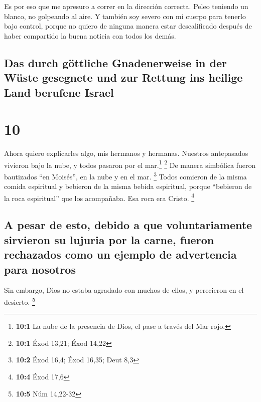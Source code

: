  Es por eso que me apresuro a correr en la dirección
correcta. Peleo teniendo un blanco, no golpeando al aire.
 Y también soy severo con mi cuerpo para tenerlo bajo
control, porque no quiero de ninguna manera estar descalificado después
de haber compartido la buena noticia con todos los demás.

\hypertarget{das-durch-guxf6ttliche-gnadenerweise-in-der-wuxfcste-gesegnete-und-zur-rettung-ins-heilige-land-berufene-israel}{%
\subsection{Das durch göttliche Gnadenerweise in der Wüste gesegnete und
zur Rettung ins heilige Land berufene
Israel}\label{das-durch-guxf6ttliche-gnadenerweise-in-der-wuxfcste-gesegnete-und-zur-rettung-ins-heilige-land-berufene-israel}}

\hypertarget{section-9}{%
\section{10}\label{section-9}}

 Ahora quiero explicarles algo, mis hermanos y hermanas.
Nuestros antepasados vivieron bajo la nube, y todos pasaron por el
mar.\footnote{\textbf{10:1} La nube de la presencia de Dios, el pase a
  través del Mar rojo.} \footnote{\textbf{10:1} Éxod 13,21; Éxod 14,22}
 De manera simbólica fueron bautizados ``en Moisés'', en
la nube y en el mar. \footnote{\textbf{10:2} Éxod 16,4; Éxod 16,35; Deut
  8,3}  Todos comieron de la misma comida espiritual
 y bebieron de la misma bebida espiritual, porque
``bebieron de la roca espiritual'' que los acompañaba. Esa roca era
Cristo. \footnote{\textbf{10:4} Éxod 17,6}

\hypertarget{a-pesar-de-esto-debido-a-que-voluntariamente-sirvieron-su-lujuria-por-la-carne-fueron-rechazados-como-un-ejemplo-de-advertencia-para-nosotros}{%
\subsection{A pesar de esto, debido a que voluntariamente sirvieron su
lujuria por la carne, fueron rechazados como un ejemplo de advertencia
para
nosotros}\label{a-pesar-de-esto-debido-a-que-voluntariamente-sirvieron-su-lujuria-por-la-carne-fueron-rechazados-como-un-ejemplo-de-advertencia-para-nosotros}}

 Sin embargo, Dios no estaba agradado con muchos de ellos,
y perecieron en el desierto. \footnote{\textbf{10:5} Núm 14,22-32}

